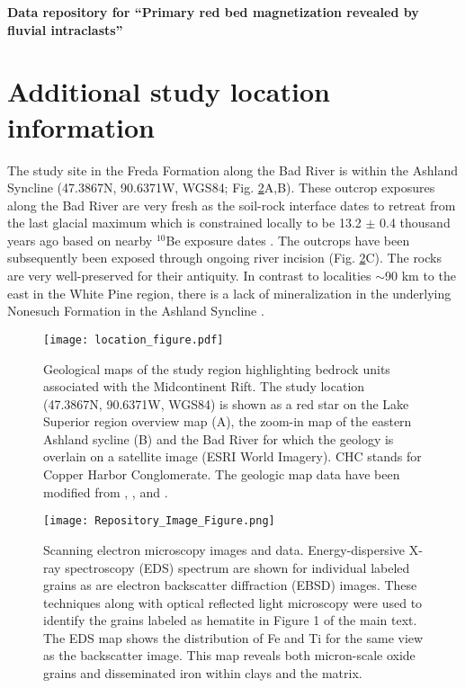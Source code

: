 \documentclass[11pt,letterpaper]{article}
\begin{document}
\begin{flushleft}
{\Large \textbf{Data repository for ``Primary red bed magnetization revealed by fluvial intraclasts''}}

\end{flushleft}

\section*{Additional study location information}
The study site in the Freda Formation along the Bad River is within the Ashland Syncline (47.3867\textdegree N, 90.6371\textdegree W, WGS84; Fig. \ref{fig:location_figure}A,B). These outcrop exposures along the Bad River are very fresh as the soil-rock interface dates to retreat from the last glacial maximum which is constrained locally to be 13.2 $\pm$ 0.4 thousand years ago based on nearby $^{10}$Be exposure dates \citep{Ullman2015a}. The outcrops have been subsequently been exposed through ongoing river incision (Fig. \ref{fig:location_figure}C). The rocks are very well-preserved for their antiquity. In contrast to localities $\sim$90 km to the east in the White Pine region, there is a lack of mineralization in the underlying Nonesuch Formation in the Ashland Syncline \citep{Stewart2017a}. 

\begin{figure}[!ht]
\noindent\texttt{[image: location\_figure.pdf]}
\caption{\small{Geological maps of the study region highlighting bedrock units associated with the Midcontinent Rift. The study location (47.3867\textdegree N, 90.6371\textdegree W, WGS84) is shown as a red star on the Lake Superior region overview map (A), the zoom-in map of the eastern Ashland sycline (B) and the Bad River for which the geology is overlain on a satellite image (ESRI World Imagery). CHC stands for Copper Harbor Conglomerate. The geologic map data have been modified from \cite{Survey2011a}, \cite{Nicholson2004a}, and \cite{Jirsa2011a}.}}
\label{fig:location_figure}
\end{figure} 

\begin{figure}[!ht]
\noindent\texttt{[image: Repository\_Image\_Figure.png]}
\caption{\small{Scanning electron microscopy images and data. Energy-dispersive X-ray spectroscopy (EDS) spectrum are shown for individual labeled grains as are electron backscatter diffraction (EBSD) images. These techniques along with optical reflected light microscopy were used to identify the grains labeled as hematite in Figure 1 of the main text. The EDS map shows the distribution of Fe and Ti for the same view as the backscatter image. This map reveals both micron-scale oxide grains and disseminated iron within clays and the matrix.}}
\label{fig:location_figure}
\end{figure} 

\newpage



\end{document}
